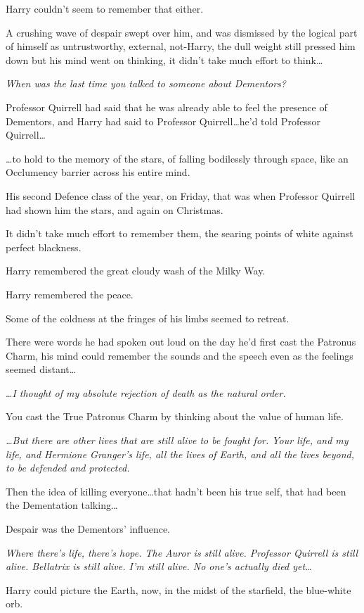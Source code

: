 Harry couldn't seem to remember that either.

A crushing wave of despair swept over him, and was dismissed by the logical
part of himself as untrustworthy, external, not-Harry, the dull weight still
pressed him down but his mind went on thinking, it didn't take much effort to
think…

\emph{When was the last time you talked to someone about Dementors?}

Professor Quirrell had said that he was already able to feel the presence of
Dementors, and Harry had said to Professor Quirrell…he'd told Professor
Quirrell…

…to hold to the memory of the stars, of falling bodilessly through
space, like an Occlumency barrier across his entire mind.

His second Defence class of the year, on Friday, that was when Professor
Quirrell had shown him the stars, and again on Christmas.

It didn't take much effort to remember them, the searing points of white
against perfect blackness.

Harry remembered the great cloudy wash of the Milky Way.

Harry remembered the peace.

Some of the coldness at the fringes of his limbs seemed to retreat.

There were words he had spoken out loud on the day he'd first cast the Patronus
Charm, his mind could remember the sounds and the speech even as the feelings
seemed distant…

…\emph{I thought of my absolute rejection of death as the natural order.}

You cast the True Patronus Charm by thinking about the value of human life.

\emph{…But there are other lives that are still alive to be fought for.
Your life, and my life, and Hermione Granger's life, all the lives of Earth,
and all the lives beyond, to be defended and protected.}

Then the idea of killing everyone…that hadn't been his true self, that
had been the Dementation talking…

Despair was the Dementors' influence.

\emph{Where there's life, there's hope. The Auror is still alive. Professor
Quirrell is still alive. Bellatrix is still alive. I'm still alive. No one's
actually died yet…}

Harry could picture the Earth, now, in the midst of the starfield, the
blue-white orb.

